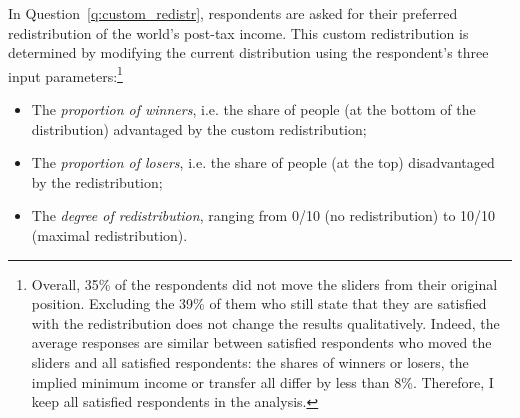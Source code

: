In Question~\ref{q:custom_redistr}, respondents are asked for their preferred redistribution of the world's post-tax income. This custom redistribution is determined by modifying the current distribution using the respondent's three input parameters:\footnote{Overall, 35\% of the respondents did not move the sliders from their original position. Excluding the 39\% of them who still state that they are satisfied with the redistribution does not change the results qualitatively. Indeed, the average responses are similar between satisfied respondents who moved the sliders and all satisfied respondents: the shares of winners or losers, %
the implied minimum income or transfer %
all differ by less than 8\%. Therefore, I keep all satisfied respondents in the analysis. %
}
\begin{itemize}
    \item The \textit{proportion of winners}, i.e. the share of people (at the bottom of the distribution) advantaged by the custom redistribution;
    \item The \textit{proportion of losers}, i.e. the share of people (at the top) disadvantaged by the redistribution;
    \item The \textit{degree of redistribution}, ranging from 0/10 (no redistribution) to 10/10 (maximal redistribution).
\end{itemize}

